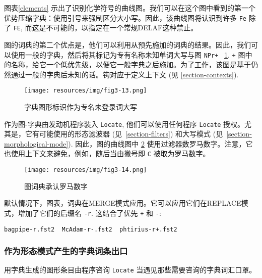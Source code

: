 \bigskip
\noindent 图表\ref{elements} 示出了识别化学符号的曲线图。我们可以在这个图中看到的第一个优势压缩字典：使用引号来强制区分大小写。因此，该曲线图将认识到许多 \verb+Fe+
除了 \verb+FE+, 而这是不可能的，以指定在一个常规DELAF这种禁止。

\bigskip
\noindent 图的词典的第二个优点是，他们可以利用从预先施加的词典的结果。因此，我们可以使用一般的字典，然后将其标记为专有名称未知单词大写与图 \verb$NPr+$ ~\ref{graph-NPr}.  \verb$+$ 图中的名称，给它一个低优先级，以便它一般字典之后施加。为了工作，该图是基于仍然通过一般的字典后未知的话。钩对应于定义上下文 (见 \ref{section-contexts}).

\begin{figure}[!h]
\begin{center}
\texttt{[image: resources/img/fig3-13.png]}
\caption{字典图形标识作为专名未登录词大写
\label{graph-NPr}}
\end{center}
\end{figure}

\bigskip
\noindent 作为图-字典由发动机程序装入 \verb+Locate+,
他们可以使用任何程序 \verb+Locate+ 授权。尤其是，它有可能使用的形态滤波器 (见~\ref{section-filters}) 和大写模式 (见~\ref{section-morphological-mode}).
因此，图的曲线图中 \ref{graph-CR} 使用过滤器数罗马数字。注意，它也使用上下文来避免，例如，随后当由撇号即 \verb+C+ 被取为罗马数字。

\begin{figure}[!p]
\begin{center}
\texttt{[image: resources/img/fig3-14.png]}
\caption{图词典承认罗马数字\label{graph-CR}}
\end{center}
\end{figure}

\bigskip
\noindent 默认情况下，图表，词典在MERGE模式应用。它可以应用它们在REPLACE模式，增加了它们的后缀名 \verb+-r+. 这结合了优先 \verb-+- 和 \verb+-+:

\bigskip
\verb?bagpipe-r.fst2  McAdam-r-.fst2  phtirius-r+.fst2?


\subsubsection{作为形态模式产生的字典词条出口}
用字典生成的图形条目由程序咨询 \verb+Locate+ 当遇见那些需要咨询的字典词汇口罩。

